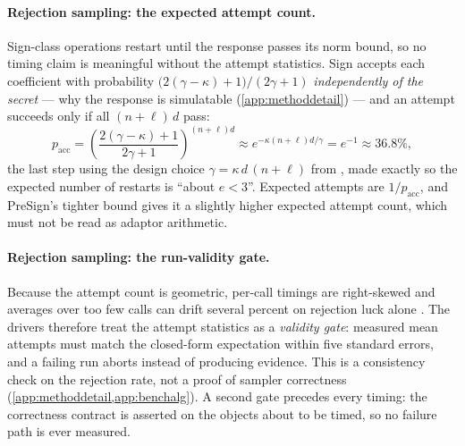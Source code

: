 \paragraph{Rejection sampling: the expected attempt count.}
Sign-class operations restart until the response passes its norm bound, so no timing claim
is meaningful without the attempt statistics.
Sign accepts each coefficient with probability
$\bigl(2(\gamma-\kappa)+1\bigr)/(2\gamma+1)$ \emph{independently of the secret} --- why the
response is simulatable (\cref{app:methoddetail}) --- and an attempt succeeds only if all
$(n+\ell)\,d$ pass:
\begin{equation}
  \label{eq:rejacc}
  p_{\mathrm{acc}}
  = \left(\frac{2(\gamma-\kappa)+1}{2\gamma+1}\right)^{(n+\ell)d}
  \approx e^{-\kappa (n+\ell) d/\gamma} = e^{-1}\approx 36.8\%,
\end{equation}
the last step using the design choice $\gamma=\kappa\,d\,(n+\ell)$ from
\cite{esgin2020post}, made exactly so the expected number of restarts is ``about $e<3$''.
Expected attempts are $1/p_{\mathrm{acc}}$, and PreSign's tighter bound gives it a slightly
higher expected attempt count, which must not be read as adaptor arithmetic.

\paragraph{Rejection sampling: the run-validity gate.}
Because the attempt count is geometric, per-call timings are right-skewed and averages
over too few calls can drift several percent on rejection luck alone
\cite{riou2026apples}. The drivers therefore treat the attempt statistics as a
\emph{validity gate}: measured mean attempts must match the closed-form expectation within
five standard errors, and a failing run aborts instead of producing evidence. This is a
consistency check on the rejection rate, not a proof of sampler correctness
(\cref{app:methoddetail,app:benchalg}). A second gate precedes every timing: the
correctness contract is asserted on the objects about to be timed, so no failure path is
ever measured.

